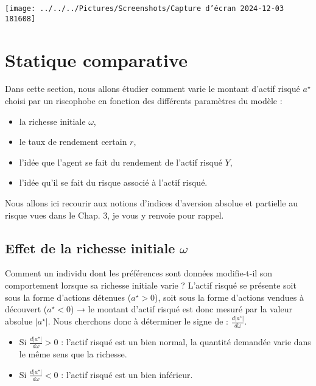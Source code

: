 \documentclass[a4paper, 12pt]{report}
\begin{document}
\begin{center}
	\texttt{[image: ../../../Pictures/Screenshots/Capture d'écran 2024-12-03 181608]}
\end{center}

\section{Statique comparative}

Dans cette section, nous allons étudier comment varie le montant d'actif risqué \(a^{\star}\) choisi par un riscophobe en fonction des différents paramètres du modèle :

\begin{itemize}
	\item la richesse initiale \(\omega\),
	\item le taux de rendement certain \(r\),
	\item l'idée que l'agent se fait du rendement de l'actif risqué \(Y\),
	\item l'idée qu'il se fait du risque associé à l'actif risqué.
\end{itemize}

Nous allons ici recourir aux notions d'indices d'aversion absolue et partielle au risque vues dans le Chap. 3, je vous y renvoie pour rappel.

\subsection{Effet de la richesse initiale \( \omega \)}

Comment un individu dont les préférences sont données modifie-t-il son comportement lorsque sa richesse initiale varie ? L'actif risqué se présente soit sous la forme d'actions détenues (\(a^{\star} > 0\)), soit sous la forme d'actions vendues à découvert (\(a^{\star} < 0\)) → le montant d'actif risqué est donc mesuré par la valeur absolue \(\left| a^{\star} \right|\). Nous cherchons donc à déterminer le signe de : \(\frac{d\left| a^{\star} \right|}{d\omega}\).

\begin{itemize}
	\item Si \(\frac{d\left| a^{\star} \right|}{d\omega} > 0\) : l'actif risqué est un bien normal, la quantité demandée varie dans le même sens que la richesse. 

	\item Si \(\frac{d\left| a^{\star} \right|}{d\omega} < 0\) : l'actif risqué est un bien inférieur.
\end{itemize}
\end{document}
